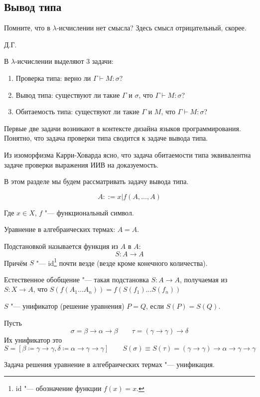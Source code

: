 \subsection{\texorpdfstring{Вывод типа}{Type deduction}}
\epigraph{Помните, что в $\lambda$-исчислении нет смысла? Здесь смысл отрицательный, скорее.}{Д.Г.}

В $\lambda$-исчислении выделяют 3 задачи:
\begin{enumerate}[label=(\asbuk*)]
    \item Проверка типа: верно ли $\Gamma \vdash M : \sigma$?
    \item Вывод типа: существуют ли такие $\Gamma$ и $\sigma$, что $\Gamma \vdash M : \sigma$?
    \item Обитаемость типа: существуют ли такие $\Gamma$ и $M$, что $\Gamma \vdash M : \sigma$?
\end{enumerate}%
Первые две задачи возникают в контексте дизайна языков программирования.
Понятно, что задача проверки типа сводится к задаче вывода типа.

Из изоморфизма Карри-Ховарда ясно, что задача обитаемости типа эквивалентна задаче проверки выражения ИИВ на доказуемость.

В этом разделе мы будем рассматривать задачу вывода типа.

\begin{definition}
    \begin{bnf}
    \[
        A ::= x | f\left(A, \ldots, A\right)
    \]
    \end{bnf}%
    Где $x \in X$, $f$ "--- функциональный символ.
\end{definition}

Уравнение в алгебраических термах: $A = A$.

\begin{definition}[подстановка] Подстановкой называется функция из $A$ в $A$:
    \[
        S : A \to A
    \]
    Причём $S$ "--- id\footnote{id "--- обозначение функции $f(x)=x$.} почти везде (везде кроме конечного количества).
\end{definition}

\begin{definition}
    Естественное обобщение "--- такая подстановка $S : A \to A$, получаемая из $S : X \to A$, что
    $S\left(f\left(A_1 \dots A_n\right)\right) = f\left(S(f_1) \ldots S(f_n)\right)$
\end{definition}

\begin{definition}[унификатор] \label{unificator}
    $S$ "--- унификатор (решение уравнения) $P=Q$, если $S(P)=S(Q)$.
\end{definition}
\begin{example}
    Пусть
    \[
        \sigma = \beta\to\alpha\to\beta \qquad \tau = (\gamma\to\gamma)\to\delta
    \]
    Их унификатор это
    \[
        S = [\beta \coloneqq \gamma\to\gamma, \delta \coloneqq \alpha\to\gamma\to\gamma]
        \qquad S(\sigma) \equiv S(\tau) = (\gamma\to\gamma)\to\alpha\to\gamma\to\gamma
    \]
\end{example}
Задача решения уравнение в алгебраических термах "--- унификация.

